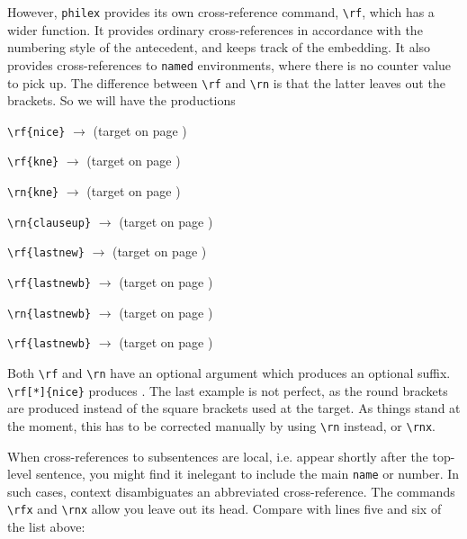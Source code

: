\documentclass[11pt]{article}
\begin{document}
However, \verb+philex+ provides  its own cross-reference command, \verb+\rf+, which has a wider function. It provides ordinary cross-references in accordance with the numbering style of the antecedent, and keeps track of the embedding. It also provides cross-references to \verb+named+ environments, where there is no counter value to pick up. The difference between \verb+\rf+ and \verb+\rn+ is that the latter leaves out the brackets. So we will have the productions 
\begin{trivlist}
\item \noindent \verb+\rf{nice}+ \(\longrightarrow\)  \hfill (target on page \pageref{nice})
\item \noindent \verb+\rf{kne}+ \(\longrightarrow\)  \hfill (target on page \pageref{kne})
\item \noindent \verb+\rn{kne}+ \(\longrightarrow\)  \hfill (target on page \pageref{kne})
\item \verb+\rn{clauseup}+ \(\longrightarrow\)   \hfill (target on page \pageref{clausesup})
\item \verb+\rf{lastnew}+ \(\longrightarrow\) \hfill (target on page \pageref{lastnew})
\item \verb+\rf{lastnewb}+ \(\longrightarrow\)  \hfill (target on page \pageref{lastnewb})
\item \verb+\rn{lastnewb}+ \(\longrightarrow\)  \hfill (target on page \pageref{craneupa})
\item \verb+\rf{lastnewb}+ \(\longrightarrow\)  \hfill (target on page \pageref{craneupa})
\end{trivlist}
	Both \verb+\rf+ and \verb+\rn+ have an optional argument which produces an optional suffix. \verb+\rf[*]{nice}+ produces . The last example is not perfect, as the round brackets are produced instead of the square brackets used at the target. As things stand at the moment, this has to be corrected manually by using \verb+\rn+ instead, or \verb+\rnx+.
	
When cross-references to  subsentences are local, i.e. appear shortly after the top-level sentence,  you might find it inelegant to include the main \verb+name+ or number. In such cases, context disambiguates an abbreviated cross-reference. The commands \verb+\rfx+ and \verb+\rnx+ allow you leave out its head. Compare with lines five and six of the list above:
\end{document}
